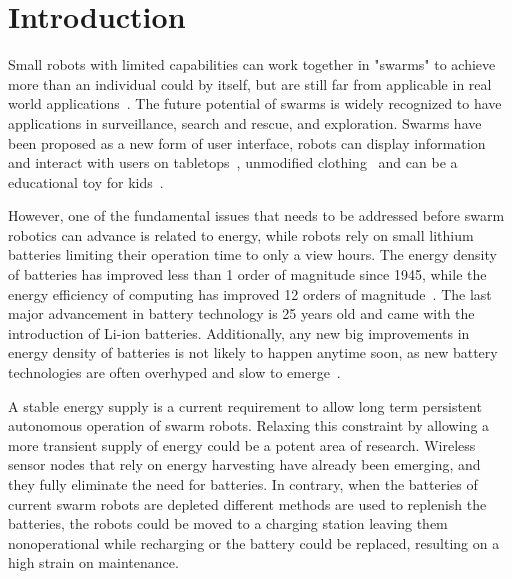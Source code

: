 \chapter{Introduction}
\label{chp:introduction}



Small robots with limited capabilities can work together in "swarms" to achieve more than an individual could by itself, but are still far from applicable in real world applications~\cite{barca_sekercioglu_2013}.
The future potential of swarms is widely recognized to have applications in surveillance, search and rescue, and exploration.
Swarms have been proposed as a new form of user interface, robots can display information and interact with users on tabletops~\cite{legoc_uist_2016}, unmodified clothing~\cite{dementyev_uist_2016} and can be a educational toy for kids~\cite{sony_toio_2017}.
\hfill \break

However, one of the fundamental issues that needs to be addressed before swarm robotics can advance is related to energy, while robots rely on small lithium batteries limiting their operation time to only a view hours. 
The energy density of batteries has improved less than 1 order of magnitude since 1945, while the energy efficiency of computing has improved 12 orders of magnitude~\cite{patel_pvc_2017}.
The last major advancement in battery technology is 25 years old and came with the introduction of Li-ion batteries.
Additionally, any new big improvements in energy density of batteries is not likely to happen anytime soon, as new battery technologies are often overhyped and slow to emerge~\cite{zachary_spec_2016}.
\hfill \break



A stable energy supply is a current requirement to allow long term persistent autonomous operation of swarm robots.
Relaxing this constraint by allowing a more transient supply of energy could be a potent area of research.
Wireless sensor nodes that rely on energy harvesting have already been emerging, and they fully eliminate the need for batteries.
In contrary, when the batteries of current swarm robots are depleted different methods are used to replenish the batteries, the robots could be moved to a charging station leaving them nonoperational while recharging or the battery could be replaced, resulting on a high strain on maintenance.

